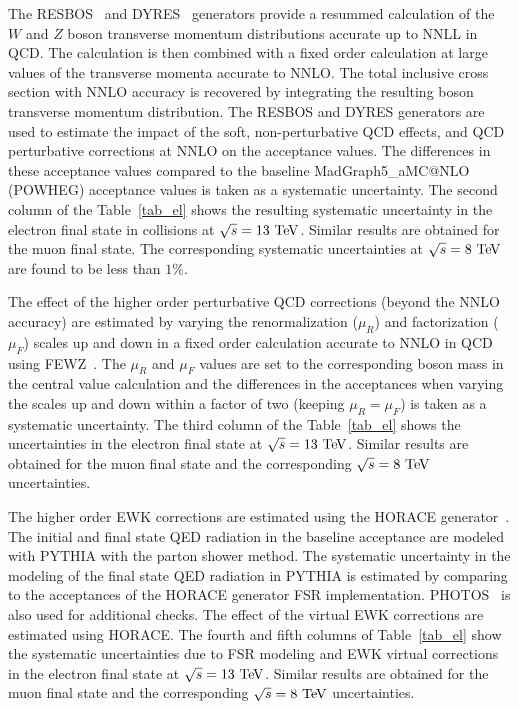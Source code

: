 The RESBOS~\cite{resbos} and DYRES~\cite{dyres,dyres2} generators provide a resummed calculation of the $W$ and $Z$ boson transverse momentum distributions accurate up to NNLL in QCD. The calculation is then combined with a fixed order calculation at large values of the transverse momenta accurate to NNLO. The total inclusive cross section with NNLO accuracy is recovered by integrating the resulting boson transverse momentum distribution. The RESBOS and DYRES generators are used to estimate the impact of the soft, non-perturbative QCD effects, and QCD perturbative corrections at NNLO on the acceptance values. The differences in these acceptance values compared to the baseline MadGraph5\_aMC@NLO (POWHEG) acceptance values is taken as a systematic uncertainty.  The second column of the Table~\ref{tab_el} shows the resulting systematic uncertainty in the electron final state in collisions at $\sqrt{s}=13~\mathrm{Te\kern -0.1em V}$. Similar results are obtained for the muon final state. The corresponding systematic uncertainties at $\sqrt{s}=8~\mathrm{Te\kern -0.1em V}$ are found to be less than $1\%$. 

The effect of the higher order perturbative QCD corrections (beyond the NNLO accuracy) are estimated by varying the renormalization ($\mu_{R}$) and factorization ($\mu_F$) scales up and down in a fixed order calculation accurate to NNLO in QCD using FEWZ~\cite{Gavin:2010az,Gavin:2012sy,Li:2012wna}. The $\mu_R$ and $\mu_F$ values are set to the corresponding boson mass in the central value calculation and the differences in the acceptances when varying the scales up and down within a factor of two (keeping $\mu_R=\mu_F$) is taken as a systematic uncertainty. The third column of the Table~\ref{tab_el} shows the uncertainties in the electron final state at $\sqrt{s}=13~\mathrm{Te\kern -0.1em V}$. Similar results are obtained for the muon final state and the corresponding $\sqrt{s}=8~\mathrm{Te\kern -0.1em V}$ uncertainties.    

The higher order EWK corrections are estimated using the HORACE generator~\cite{Calame:608890,CarloniCalame:2005vc,CarloniCalame:2006zq,CarloniCalame:2007cd}. The initial and final state QED radiation in the baseline acceptance are modeled with PYTHIA with the parton shower method. The systematic uncertainty in the modeling of the final state QED radiation in PYTHIA is estimated by comparing to the acceptances of the HORACE generator FSR implementation. PHOTOS~\cite{photos} is also used for additional checks. The effect of the virtual EWK corrections are estimated using HORACE. The fourth and fifth columns of Table~\ref{tab_el} show the systematic uncertainties due to FSR modeling and EWK virtual corrections in the electron final state at $\sqrt{s}=13~\mathrm{Te\kern -0.1em V}$. Similar results are obtained for the muon final state and the corresponding $\sqrt{s}=8~\mathrm{Te\kern -0.1em V}$ uncertainties. 


